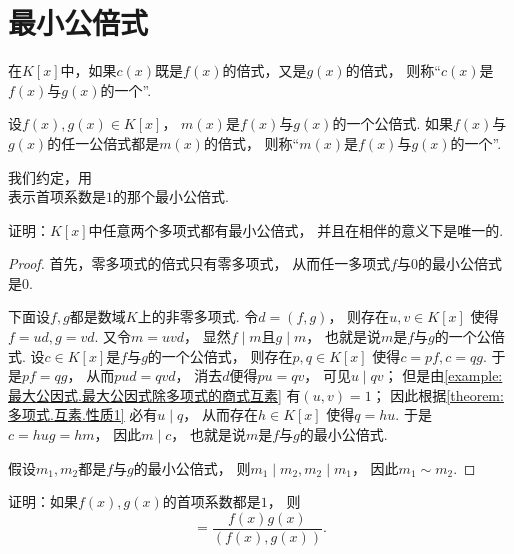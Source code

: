 \section{最小公倍式}
\begin{definition}
在\(K[x]\)中，如果\(c(x)\)既是\(f(x)\)的倍式，又是\(g(x)\)的倍式，
则称“\(c(x)\)是\(f(x)\)与\(g(x)\)的一个”.
\end{definition}

\begin{definition}
设\(f(x),g(x) \in K[x]\)，
\(m(x)\)是\(f(x)\)与\(g(x)\)的一个公倍式.
如果\(f(x)\)与\(g(x)\)的任一公倍式都是\(m(x)\)的倍式，
则称“\(m(x)\)是\(f(x)\)与\(g(x)\)的一个”.
\end{definition}

我们约定，用\begin{equation*}
	[f(x), g(x)]
\end{equation*}表示首项系数是\(1\)的那个最小公倍式.

\begin{example}
证明：\(K[x]\)中任意两个多项式都有最小公倍式，
并且在相伴的意义下是唯一的.
\begin{proof}
首先，零多项式的倍式只有零多项式，
从而任一多项式\(f\)与\(0\)的最小公倍式是\(0\).

下面设\(f,g\)都是数域\(K\)上的非零多项式.
令\(d=(f,g)\)，
则存在\(u,v \in K[x]\)
使得\(f=ud,g=vd\).
又令\(m=uvd\)，
显然\(f \mid m\)且\(g \mid m\)，
也就是说\(m\)是\(f\)与\(g\)的一个公倍式.
设\(c \in K[x]\)是\(f\)与\(g\)的一个公倍式，
则存在\(p,q \in K[x]\)
使得\(c=pf,c=qg\).
于是\(pf=qg\)，
从而\(pud=qvd\)，
消去\(d\)便得\(pu=qv\)，
可见\(u \mid qv\)；
但是由\cref{example:最大公因式.最大公因式除多项式的商式互素}
有\((u,v)=1\)；
因此根据\cref{theorem:多项式.互素.性质1}
必有\(u \mid q\)，
从而存在\(h \in K[x]\)
使得\(q=hu\).
于是\(c=hug=hm\)，
因此\(m \mid c\)，
也就是说\(m\)是\(f\)与\(g\)的最小公倍式.

假设\(m_1,m_2\)都是\(f\)与\(g\)的最小公倍式，
则\(m_1 \mid m_2,
m_2 \mid m_1\)，
因此\(m_1 \sim m_2\).
\end{proof}
\end{example}

\begin{example}
证明：如果\(f(x),g(x)\)的首项系数都是\(1\)，
则\begin{equation*}
	[f(x),g(x)]
	= \frac{f(x) g(x)}{(f(x),g(x))}.
\end{equation*}
\end{example}
